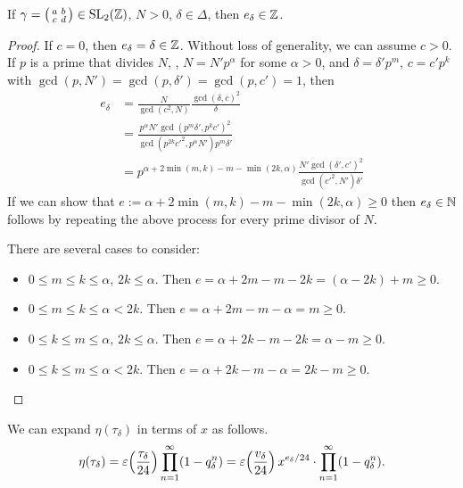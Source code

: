 \documentclass{article}
\begin{document}
\begin{Lemma}
  If $\gamma =
\bigl(
\begin{smallmatrix}
  a & b\\
  c & d
\end{smallmatrix}
\bigr) \in \SL2Z$, $N > 0$, $\delta \in \Delta$, then
$e_\delta \in \mathbb{Z}$.
\end{Lemma}
\begin{proof}
If $c=0$, then $e_\delta=\delta\in\mathbb{Z}$. Without loss of generality,
we can assume $c>0$.
If $p$ is a prime that divides $N$, \ie, $N=N'p^\alpha$ for some
$\alpha>0$, and $\delta = \delta' p^m$, $c=c' p^k$ with
$\gcd(p,N')=\gcd(p,\delta')=\gcd(p,c')=1$, then
\begin{align*}
  e_\delta
  &=
  \frac{N}{\gcd(c^2,N)} \frac{\gcd(\delta,c)^2}{\delta}\\
  &=
  \frac{p^\alpha N' \gcd(p^m \delta', p^k c')^2}{\gcd(p^{2k}
    c'^2,p^\alpha N') p^m \delta'}\\
  &=
  p^{\alpha + 2 \min(m,k) - m - \min(2k, \alpha)}
  \frac{N' \gcd(\delta', c')^2}{\gcd(c'^2, N') \delta'}
\end{align*}
If we can show that $e:=\alpha + 2 \min(m,k) - m - \min(2k,
\alpha)\ge0$ then $e_\delta\in\mathbb{N}$ follows by repeating the above
process for every prime divisor of $N$.

There are several cases to consider:
\begin{itemize}
\item $0\le m\le k \le \alpha$, $2k \le \alpha$. Then
  $e=\alpha+2m-m-2k=(\alpha-2k)+m\ge0$.
\item $0\le m\le k \le \alpha < 2k$. Then
  $e=\alpha+2m-m-\alpha=m\ge0$.

\item $0\le k\le m \le \alpha$, $2k \le \alpha$. Then
  $e=\alpha+2k-m-2k=\alpha-m\ge0$.
\item $0\le k\le m \le \alpha < 2k$. Then
  $e=\alpha+2k-m-\alpha=2k-m\ge0$.
\end{itemize}
\end{proof}

We can expand $\eta(\tau_\delta)$ in terms of $x$ as follows.
\begin{gather*}
  \eta(\tau_\delta)
  =
    \varepsilon\!\left({\frac{\tau_\delta}{24}}\right)
    \prod_{n=1}^{\infty}(1-q_\delta^n)
  =
  \varepsilon\!\left(\frac{v_\delta}{24}\right) x^{e_\delta/24}
  \cdot
  \prod_{n=1}^{\infty}(1-q_\delta^n).
\end{gather*}
\end{document}
